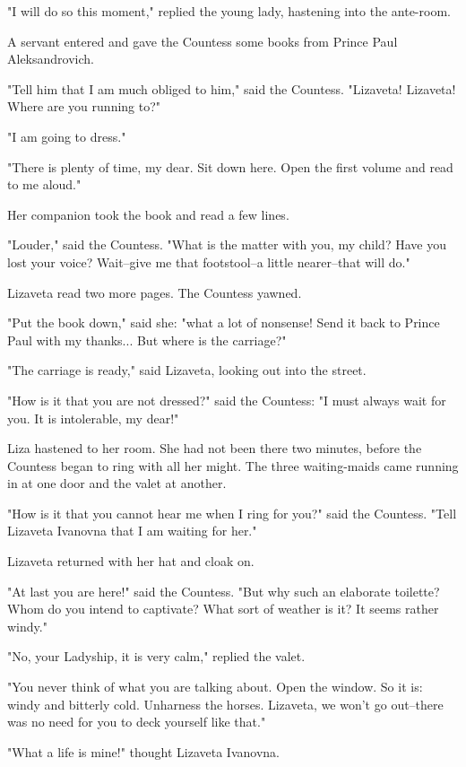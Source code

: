 "I will do so this moment," replied the young lady, hastening into the
ante-room.

A servant entered and gave the Countess some books from Prince Paul
Aleksandrovich.

"Tell him that I am much obliged to him," said the Countess.
"Lizaveta! Lizaveta! Where are you running to?"

"I am going to dress."

"There is plenty of time, my dear. Sit down here. Open the first
volume and read to me aloud."

Her companion took the book and read a few lines.

"Louder," said the Countess. "What is the matter with you, my child?
Have you lost your voice? Wait--give me that footstool--a little
nearer--that will do."

Lizaveta read two more pages. The Countess yawned.

"Put the book down," said she: "what a lot of nonsense! Send it back
to Prince Paul with my thanks... But where is the carriage?"

"The carriage is ready," said Lizaveta, looking out into the street.

"How is it that you are not dressed?" said the Countess: "I must
always wait for you. It is intolerable, my dear!"

Liza hastened to her room. She had not been there two minutes, before
the Countess began to ring with all her might. The three waiting-maids
came running in at one door and the valet at another.

"How is it that you cannot hear me when I ring for you?" said the
Countess. "Tell Lizaveta Ivanovna that I am waiting for her."

Lizaveta returned with her hat and cloak on.

"At last you are here!" said the Countess. "But why such an elaborate
toilette? Whom do you intend to captivate? What sort of weather is it?
It seems rather windy."

"No, your Ladyship, it is very calm," replied the valet.

"You never think of what you are talking about. Open the window. So it
is: windy and bitterly cold. Unharness the horses. Lizaveta, we won't
go out--there was no need for you to deck yourself like that."

"What a life is mine!" thought Lizaveta Ivanovna.

